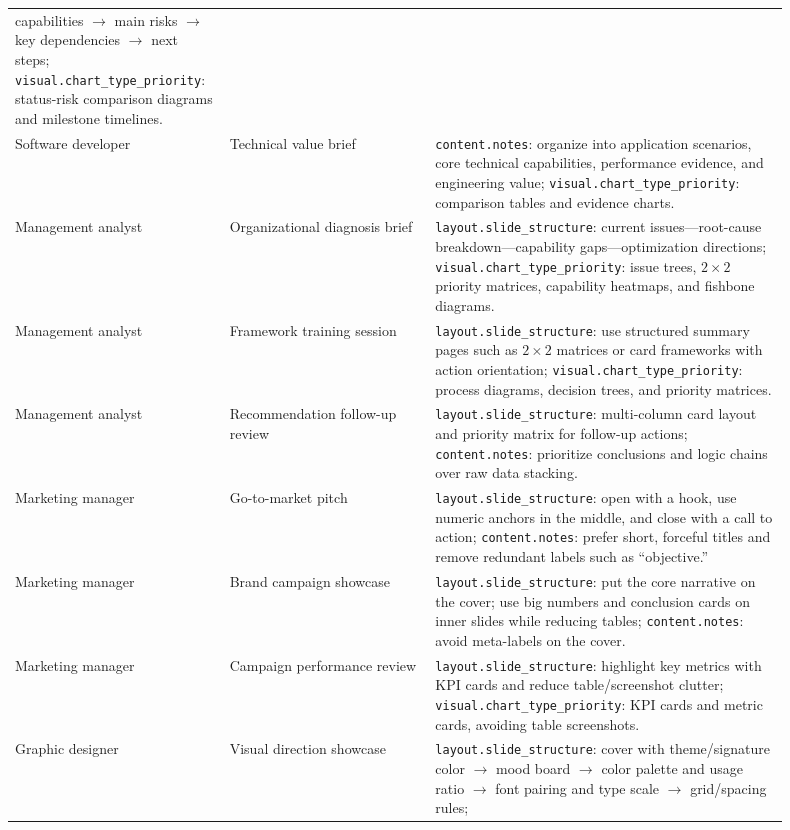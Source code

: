 \documentclass{llmxive}
\begin{document}
\begin{longtable}{>{\scriptsize\arraybackslash}p{0.22\linewidth}
                  >{\scriptsize\arraybackslash}p{0.25\linewidth}
                  >{\scriptsize\arraybackslash}p{0.43\linewidth}}
capabilities $\rightarrow$ main risks $\rightarrow$ key dependencies
$\rightarrow$ next steps;
\texttt{visual.chart\_type\_priority}: status-risk comparison diagrams and
milestone timelines. \\
Software developer & Technical value brief &
\texttt{content.notes}: organize into application scenarios, core technical
capabilities, performance evidence, and engineering value;
\texttt{visual.chart\_type\_priority}: comparison tables and evidence charts. \\
\midrule
Management analyst & Organizational diagnosis brief &
\texttt{layout.slide\_structure}: current issues---root-cause breakdown---capability
gaps---optimization directions;
\texttt{visual.chart\_type\_priority}: issue trees, $2\times2$ priority
matrices, capability heatmaps, and fishbone diagrams. \\
Management analyst & Framework training session &
\texttt{layout.slide\_structure}: use structured summary pages such as
$2\times2$ matrices or card frameworks with action orientation;
\texttt{visual.chart\_type\_priority}: process diagrams, decision trees, and
priority matrices. \\
Management analyst & Recommendation follow-up review &
\texttt{layout.slide\_structure}: multi-column card layout and priority
matrix for follow-up actions;
\texttt{content.notes}: prioritize conclusions and logic chains over raw data
stacking. \\
\midrule
Marketing manager & Go-to-market pitch &
\texttt{layout.slide\_structure}: open with a hook, use numeric anchors in the
middle, and close with a call to action;
\texttt{content.notes}: prefer short, forceful titles and remove redundant
labels such as ``objective.'' \\
Marketing manager & Brand campaign showcase &
\texttt{layout.slide\_structure}: put the core narrative on the cover; use big
numbers and conclusion cards on inner slides while reducing tables;
\texttt{content.notes}: avoid meta-labels on the cover. \\
Marketing manager & Campaign performance review &
\texttt{layout.slide\_structure}: highlight key metrics with KPI cards and
reduce table/screenshot clutter;
\texttt{visual.chart\_type\_priority}: KPI cards and metric cards, avoiding
table screenshots. \\
\midrule
Graphic designer & Visual direction showcase &
\texttt{layout.slide\_structure}: cover with theme/signature color
$\rightarrow$ mood board $\rightarrow$ color palette and usage ratio
$\rightarrow$ font pairing and type scale $\rightarrow$ grid/spacing rules;

\end{longtable}
\end{document}
